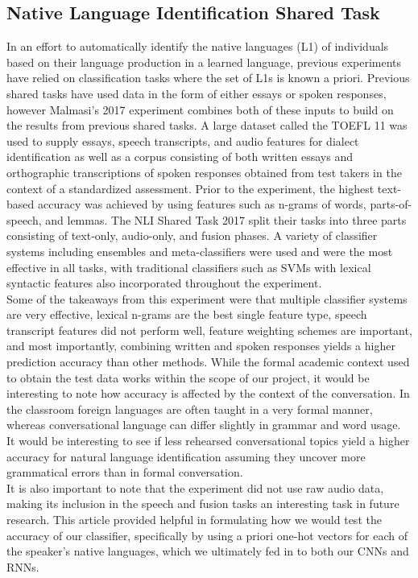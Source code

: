 \documentclass[11pt,a4paper]{article}
\newcommand\tab[1][1cm]{\hspace*{#1}}
\begin{document}
 \subsection{Native Language Identification Shared Task}
 \tab In an effort to automatically identify the native languages (L1) of individuals based on their language production in a learned language, previous experiments have relied on classification tasks where the set of L1s is known a priori. Previous shared tasks have used data in the form of either essays or spoken responses, however Malmasi's 2017 experiment combines both of these inputs to build on the results from previous shared tasks. A large dataset called the TOEFL 11 was used to supply essays, speech transcripts, and audio features for dialect identification as well as a corpus consisting of both written essays and orthographic transcriptions of spoken responses obtained from test takers in the context of a standardized assessment. Prior to the experiment, the highest text-based accuracy was achieved by using features such as n-grams of words, parts-of-speech, and lemmas. The NLI Shared Task 2017 split their tasks into three parts consisting of text-only, audio-only, and fusion phases. A variety of classifier systems including ensembles and meta-classifiers were used and were the most effective in all tasks, with traditional classifiers such as SVMs with lexical syntactic features also incorporated throughout the experiment.\\ \tab Some of the takeaways from this experiment were that multiple classifier systems are very effective, lexical n-grams are the best single feature type, speech transcript features did not perform well, feature weighting schemes are important, and most importantly, combining written and spoken responses yields a higher prediction accuracy than other methods. While the formal academic context used to obtain the test data works within the scope of our project, it would be interesting to note how accuracy is affected by the context of the conversation. In the classroom foreign languages are often taught in a very formal manner, whereas conversational language can differ slightly in grammar and word usage. It would be interesting to see if less rehearsed conversational topics yield a higher accuracy for natural language identification assuming they uncover more grammatical errors than in formal conversation.\\ \tab It is also important to note that the experiment did not use raw audio data, making its inclusion in the speech and fusion tasks an interesting task in future research. This article provided helpful in formulating how we would test the accuracy of our classifier, specifically by using a priori one-hot vectors for each of the speaker's native languages, which we ultimately fed in to both our CNNs and RNNs.
\end{document}
